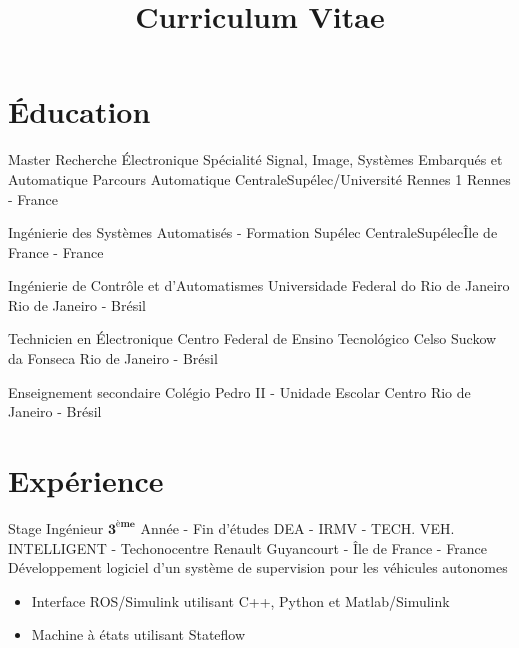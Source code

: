 \documentclass[11pt,a4paper,sans]{moderncv}
\title{Curriculum Vitae}
\begin{document}
\makecvtitle


\vspace{-40pt}
\section{Éducation}
{Master Recherche Électronique \newline Spécialité Signal, Image, Systèmes Embarqués et Automatique}
{\newline Parcours Automatique \newline CentraleSupélec/Université Rennes 1}
{Rennes - France}{}{}

{Ingénierie des Systèmes Automatisés - Formation Supélec}
{\newline CentraleSupélec}{Île de France - France}{}{}

{Ingénierie de Contrôle et d'Automatismes}
{\newline Universidade Federal do Rio de Janeiro}
{Rio de Janeiro - Brésil}{}{}  

{Technicien en Électronique}
{\newline Centro Federal de Ensino Tecnológico Celso Suckow da Fonseca}
{\newline Rio de Janeiro - Brésil}{}{}

{Enseignement secondaire}
{\newline Colégio Pedro II - Unidade Escolar Centro}
{Rio de Janeiro - Brésil}{}{}

\section{Expérience}


{Stage Ingénieur $ \mathbf{3^{ème}} $ Année - Fin d'études}
{\newline DEA - IRMV - TECH. VEH. INTELLIGENT - Techonocentre Renault}
{\newline Guyancourt - Île de France - France
  \newline Développement logiciel d'un système de supervision pour les véhicules
  autonomes}
{}{
  \begin{itemize}
  \item Interface ROS/Simulink utilisant C++, Python et Matlab/Simulink
  \item Machine à états utilisant Stateflow
  \end{itemize}
}
              
\end{document}
